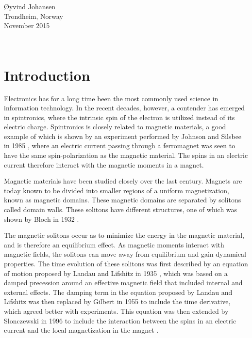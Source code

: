 \documentclass[12pt, a4paper, twoside, openright]{article}		%
\let\oldsection\section
\def\section{\cleardoublepage\oldsection}
\newcommand\blankpage{%
    \null
    \thispagestyle{empty}%
    \addtocounter{page}{-1}%
    \newpage}
\numberwithin{equation}{section}
\begin{document}
\begin{minipage}{0.95\textwidth}
\begin{flushright}
\O yvind Johansen \\
Trondheim, Norway \\
November 2015
\end{flushright}
\end{minipage}\\[4cm]

\newpage

\tableofcontents

\newpage
\afterpage{\blankpage}


\section{Introduction}
Electronics has for a long time been the most commonly used science in information technology. In the recent decades, however, a contender has emerged in spintronics, where the intrinsic spin of the electron is utilized instead of its electric charge. Spintronics is closely related to magnetic materials, a good example of which is shown by an experiment performed by Johnson and Silsbee in 1985 \cite{JohnsonSilsbee1985}, where an electric current passing through a ferromagnet was seen to have the same spin-polarization as the magnetic material. The spins in an electric current therefore interact with the magnetic moments in a magnet.

Magnetic materials have been studied closely over the last century. Magnets are today known to be divided into smaller regions of a uniform magnetization, known as magnetic domains. These magnetic domains are separated by solitons called domain walls. These solitons have different structures, one of which was shown by Bloch in 1932 \cite{Bloch1932}. 

The magnetic solitons occur as to minimize the energy in the magnetic material, and is therefore an equilibrium effect. As magnetic moments interact with magnetic fields, the solitons can move away from equilibrium and gain dynamical properties. The time evolution of these solitons was first described by an equation of motion proposed by Landau and Lifshitz in 1935 \cite{LandauLifshitz1935}, which was based on a damped precession around an effective magnetic field that included internal and external effects. The damping term in the equation proposed by Landau and Lifshitz was then replaced by Gilbert in 1955 \cite{Gilbert2004Classics} to include the time derivative, which agreed better with experiments. This equation was then extended by Slonczewski in 1996 to include the interaction between the spins in an electric current and the local magnetization in the magnet \cite{Slonczewski1996}.
\end{document}
